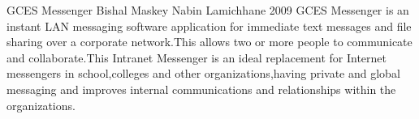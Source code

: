  \begin{conf-abstract}[]
{GCES Messenger}
{
Bishal Maskey
Nabin Lamichhane
}
{2009}
GCES Messenger is an instant LAN messaging software application for immediate text messages and file sharing over a corporate network.This allows two or more people to
 communicate and collaborate.This Intranet Messenger is an ideal replacement for Internet messengers in school,colleges and other organizations,having private and 
global messaging and improves internal communications and relationships within the organizations.
  \end{conf-abstract}